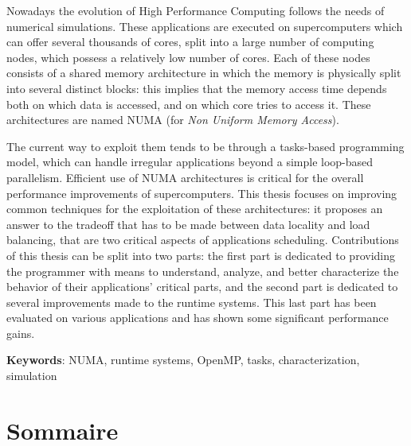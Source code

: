 Nowadays the evolution of High Performance Computing follows the needs of numerical simulations.
These applications are executed on supercomputers which can offer several thousands of cores, split into a large number of computing nodes, which possess a relatively low number of cores.
Each of these nodes consists of a shared memory architecture in which the memory is physically split into several distinct blocks: this implies that the memory access time depends both on which data is accessed, and on which core tries to access it.
These architectures are named NUMA (for \emph{Non Uniform Memory Access}).

The current way to exploit them tends to be through a tasks-based programming model, which can handle irregular applications beyond a simple loop-based parallelism.
Efficient use of NUMA architectures is critical for the overall performance improvements of supercomputers.
This thesis focuses on improving common techniques for the exploitation of these architectures: it proposes an answer to the tradeoff that has to be made between data locality and load balancing, that are two critical aspects of applications scheduling.
Contributions of this thesis can be split into two parts: the first part is dedicated to providing the programmer with means to understand, analyze, and better characterize the behavior of their applications' critical parts, and the second part is dedicated to several improvements made to the runtime systems.
This last part has been evaluated on various applications and has shown some significant performance gains.


\quad

\textbf{Keywords}: NUMA, runtime systems, OpenMP, tasks, characterization, simulation




\cleardoublepage
\dominitoc
\makeatletter
\renewcommand{\contentsname}{Sommaire}
\renewcommand{\tableofcontents}[1][\contentsname]{%
  \chapter*{#1}
}
\makeatother
\tableofcontents
